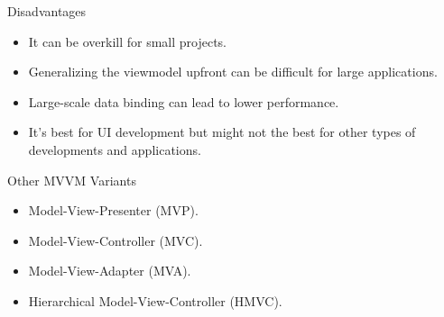 \documentclass{beamer}
\begin{document}
\begin{frame}{Disadvantages}
\begin{itemize}
\item It can be overkill for small projects. 
\item Generalizing the viewmodel upfront can be difficult for large applications.
\item Large-scale data binding can lead to lower performance.
\item It's best for UI development but might not the best for other types of developments and  applications.
\end{itemize}
\end{frame}

\begin{frame}{Other MVVM Variants}
\begin{itemize}
\item Model-View-Presenter (MVP).
\item Model-View-Controller (MVC).
\item Model-View-Adapter (MVA).
\item Hierarchical Model-View-Controller (HMVC).

\end{itemize}
\end{frame}
\end{document}
